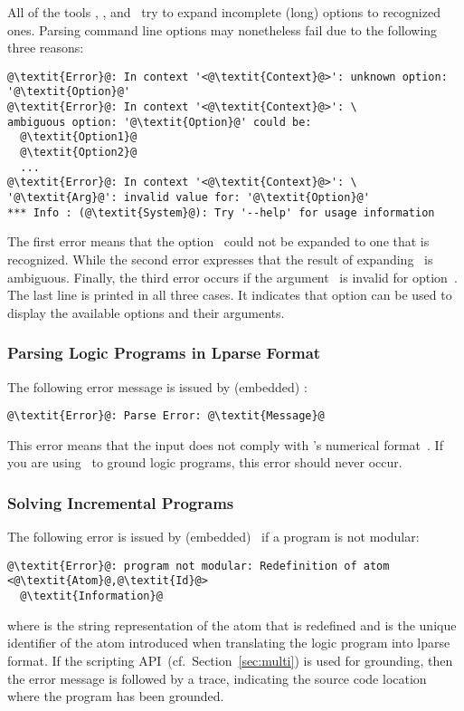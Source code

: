 All of the tools \gringo, \clasp, and \clingo\
try to expand incomplete (long) options to recognized ones.
Parsing command line options may nonetheless fail due to the following three reasons:
%
\begin{lstlisting}[numbers=none,escapechar=@]
@\textit{Error}@: In context '<@\textit{Context}@>': unknown option: '@\textit{Option}@'
@\textit{Error}@: In context '<@\textit{Context}@>': \
ambiguous option: '@\textit{Option}@' could be:
  @\textit{Option1}@
  @\textit{Option2}@
  ...
@\textit{Error}@: In context '<@\textit{Context}@>': \
'@\textit{Arg}@': invalid value for: '@\textit{Option}@'
*** Info : (@\textit{System}@): Try '--help' for usage information
\end{lstlisting}
%
The first error means that the option~
could not be expanded to one that is recognized.
While the second error expresses that the result of expanding~\codeit{Option} is ambiguous.
Finally, the third error occurs if the argument~ is invalid for option~.
The last line is printed in all three cases.
It indicates that option \code{--help} can be used to display the available options and their arguments.

\subsubsection{Parsing Logic Programs in Lparse Format}\label{subsec:error:lparse}

The following error message is issued by (embedded) \clasp:
%
\begin{lstlisting}[numbers=none,escapechar=@]
@\textit{Error}@: Parse Error: @\textit{Message}@
\end{lstlisting}
%
This error means that the input does not comply with \lparse's numerical format~\cite{lparseManual}.
If you are using \gringo\ to ground logic programs,
this error should never occur.

\subsubsection{Solving Incremental Programs}
The following error is issued by (embedded) \clasp\ if a program is not modular:
\begin{lstlisting}[numbers=none,escapechar=@]
@\textit{Error}@: program not modular: Redefinition of atom <@\textit{Atom}@,@\textit{Id}@>
  @\textit{Information}@
\end{lstlisting}
where \codeit{Atom} is the string representation of the atom that is redefined
and \codeit{Id} is the unique identifier of the atom introduced when translating the logic program into lparse format.
If the scripting API~(cf.~Section~\ref{sec:multi}) is used for grounding,
then the error message is followed by a trace,
indicating the source code location where the program has been grounded.

